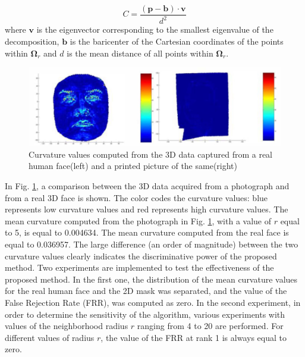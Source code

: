 \documentclass[journal]{IEEEtran}
\begin{document}
\begin{equation}
\label{eq_F_1}
C = \frac{\mathbf{(p-b)\cdot v}}{d^2}
\end{equation}
where $\mathbf{v}$ is the eigenvector corresponding to the smallest eigenvalue of the decomposition, $\mathbf{b}$ is the baricenter of the Cartesian coordinates of the points within $\mathbf{\Omega}_r$ and $d$ is the mean distance of all points within $\mathbf{\Omega}_r$.

\begin{figure}[!b]
\centering
\includegraphics[width=1\linewidth]{img/F_2}
\caption{Curvature values computed from the 3D data captured from a real human face(left) and a printed picture of the same(right)}
\label{fig_F_2}
\end{figure}

In Fig. \ref{fig_F_2}, a comparison between the 3D data acquired from a photograph and from a real 3D face is shown. The color codes the curvature values: blue represents low curvature values and red represents high curvature values. The mean curvature computed from the photograph in Fig. \ref{fig_F_2}, with a value of $r$ equal to 5, is equal to 0.004634. The mean curvature computed from the real face is equal to 0.036957. The large difference (an order of magnitude) between the two curvature values clearly indicates the discriminative power of the proposed method.
Two experiments are implemented to test the effectiveness of the proposed method. In the first one, the distribution of the mean curvature values for the real human face and the 2D mask was separated, and the value of the False Rejection Rate (FRR), was computed as zero. In the second experiment, in order to determine the sensitivity of the algorithm, various experiments with values of the neighborhood radius $r$ ranging from 4 to 20 are performed. For different values of radius $r$, the value of the FRR at rank 1 is always equal to zero.
\end{document}
